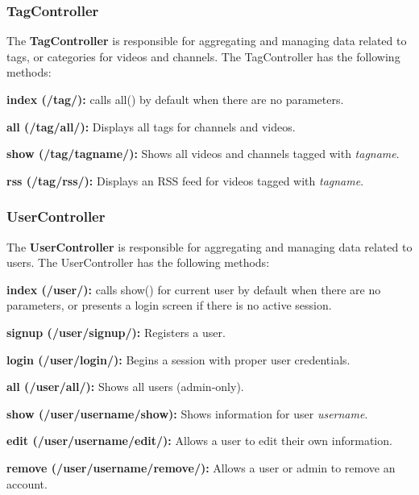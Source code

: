 \documentclass[a4paper,12pt]{report}
\begin{document}
\subsubsection{TagController}
The \textbf{TagController} is responsible for aggregating and managing data related to tags, or categories for videos and channels. The TagController has the following methods:
\begin{description}
\item{\textbf{index (/tag/): } calls all() by default when there are no parameters.}
\item{\textbf{all (/tag/all/): } Displays all tags for channels and videos.}
\item{\textbf{show (/tag/tagname/): } Shows all videos and channels tagged with \textit{tagname}.}
\item{\textbf{rss (/tag/rss/): } Displays an RSS feed for videos tagged with \textit{tagname}.} \\
\end{description} 

\subsubsection{UserController}
The \textbf{UserController} is responsible for aggregating and managing data related to users. The UserController has the following methods:
\begin{description}
\item{\textbf{index (/user/): } calls show() for current user by default when there are no parameters, or presents a login screen if there is no active session.}
\item{\textbf{signup (/user/signup/): } Registers a user.}
\item{\textbf{login (/user/login/): } Begins a session with proper user credentials.}
\item{\textbf{all (/user/all/): } Shows all users (admin-only).}
\item{\textbf{show (/user/username/show): } Shows information for user \textit{username}.}
\item{\textbf{edit (/user/username/edit/): } Allows a user to edit their own information.}
\item{\textbf{remove (/user/username/remove/): } Allows a user or admin to remove an account.} \\
\end{description}
\end{document}
